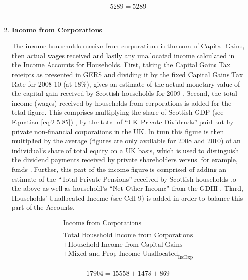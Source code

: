 \begin{enumerate}
\begin{equation} \nonumber
5289 = 5289
\end{equation}\\


\item \textbf {Income from Corporations}

The income households receive from corporations is the sum of Capital Gains, then actual wages received and lastly any unallocated income calculated in the Income Accounts for Households. 
First, taking the Capital Gains Tax receipts as presented in GERS and dividing it by the fixed  Capital Gains Tax Rate for 2008-10 (at 18\%), gives an estimate of the actual monetary value of the capital gain received by Scottish households for 2009 \cite{ScotGov2013b,HMRC2013}.
Second, the total income (wages) received by households from corporations is added for the total figure. This comprises multiplying the share of Scottish GDP (see Equation \ref{eq:2.5.85}) , by the total of ``UK Private Dividends'' paid out by private non-financial corporations in the UK. In turn this figure is then multiplied by the average (figures are only available for 2008 and 2010) of an individual`s share of total equity on a UK basis, which is used to distinguish the dividend payments received by private shareholders versus, for example, funds \cite{ONS2011c}. Further, this part of the income figure is comprised of adding an estimate of the ``Total Private Pensions'' received by Scottish households to the above as well as household`s ``Net Other Income'' from the GDHI \cite{ONS2012}. 
Third, Households' Unallocated Income (see Cell 9) is added in order to balance this part of the Accounts.  


\begin{equation}
\begin{split}
\text{Income from Corporations} =  \\ \\
\text{Total Household Income from Corporations}\\
+\text{Household Income from Capital Gains}\\
+\text{Mixed and Prop Income Unallocated}_\text{IncExp}\\
\end{split} \label{eq:2.5.4}
\end{equation}

\begin{equation} \nonumber
17904 = 15558+1478+869
\end{equation}


\end{enumerate}
